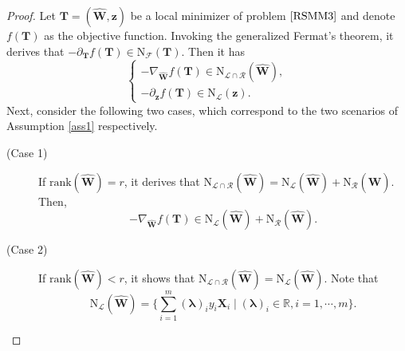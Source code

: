 \documentclass[sn-mathphys]{JORSC-jnl}%
\theoremstyle{thmstyleone}%
\theoremstyle{thmstylethree}%
\theoremstyle{thmstyleone} %
\begin{document}
\begin{proof}
	Let $\mathbf{T}=(\hat{\mathbf{W}}, \mathbf{z})$ be a local minimizer of  problem $\eqref{RSMM3}$ and denote $f(\mathbf{T})$ as the objective function. Invoking the generalized Fermat's theorem, it derives that  
	$-\partial_\mathbf{T} f(\mathbf{T})\in\mathrm{N}_{\mathcal{F}}(\mathbf{T})$. Then it has
	\begin{equation}\label{T1}
		\begin{cases}
			-\nabla_{\hat{\mathbf{W}}}f(\mathbf{T})\in\mathrm{N}_{\mathcal{L}\cap \mathcal{R}}(\hat{\mathbf{W}}),\\
			-\partial_\mathbf{z} f(\mathbf{T})\in\mathrm{N}_{\mathcal{L}}(\mathbf{z}).
		\end{cases} 
	\end{equation}
Next, consider the following two cases, which correspond to the two scenarios of Assumption \ref{ass1} respectively.
\begin{description}
    \item[(Case 1)] If $\text{rank}(\hat{\mathbf{W}})=r$, it derives that  $\mathrm{N}_{\mathcal{L}\cap \mathcal{R}}(\hat{\mathbf{W}})=\mathrm{N}_{\mathcal{L}}(\hat{\mathbf{W}})+\mathrm{N}_{\mathcal{R}}(\hat{\mathbf{W}})$.  Then,	
\begin{equation*}\label{W1}
		-\nabla_{\hat{\mathbf{W}}} f(\mathbf{T})\in\mathrm{N}_{\mathcal{L}}(\hat{\mathbf{W}})+\mathrm{N}_{\mathcal{R}}(\hat{\mathbf{W}}).
	\end{equation*}

    \item[(Case 2)]     If $\text{rank}(\hat{\mathbf{W}})<r$, it shows that $\mathrm{N}_{\mathcal{L}\cap \mathcal{R}}(\hat{\mathbf{W}})=\mathrm{N}_{\mathcal{L}}(\hat{\mathbf{W}})$. Note that
	\begin{equation*}
		\mathrm{N}_{\mathcal{L}}(\hat{\mathbf{W}})=\{\sum_{i=1}^m(\bm{\lambda})_i y_i\mathbf{X}_i \mid (\bm{\lambda})_i\in\mathbb{R}, i=1,\cdots,m \}.
	\end{equation*}
    

\end{description}
\end{proof}
\end{document}
